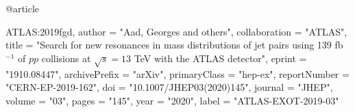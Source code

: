 @article{ATLAS:2019fgd,
    author = "Aad, Georges and others",
    collaboration = "ATLAS",
    title = "{Search for new resonances in mass distributions of jet pairs using 139 fb$^{-1}$ of $pp$ collisions at $\sqrt{s}=13$ TeV with the ATLAS detector}",
    eprint = "1910.08447",
    archivePrefix = "arXiv",
    primaryClass = "hep-ex",
    reportNumber = "CERN-EP-2019-162",
    doi = "10.1007/JHEP03(2020)145",
    journal = "JHEP",
    volume = "03",
    pages = "145",
    year = "2020",
    label = "ATLAS-EXOT-2019-03"

}

